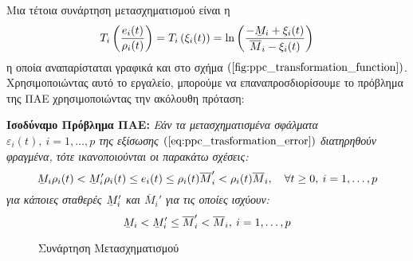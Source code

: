 Μια τέτοια συνάρτηση μετασχηματισμού είναι η
\begin{equation}
	T_i \left( \frac{e_i(t)}{\rho_i(t)} \right) = T_i \left( \xi_i(t) \right) =
	\ln \left( \frac{-\barbelow{M}_i + \xi_i(t) }{\overline{M}_i - \xi_i(t)} \right)
	\label{eq:ppc_log_transform}
\end{equation}
η οποία αναπαρίσταται γραφικά και στο σχήμα $(\ref{fig:ppc_transformation_function})$. Χρησιμοποιώντας αυτό το εργαλείο, μπορούμε να επαναπροσδιορίσουμε το πρόβλημα της ΠΑΕ χρησιμοποιώντας την ακόλουθη πρόταση:

\textbf{Ισοδύναμο Πρόβλημα ΠΑΕ:}
\textit{ Εάν τα μετασχηματισμένα σφάλματα $\varepsilon_i(t), \: i = 1,\dots ,p$ της εξίσωσης $(\ref{eq:ppc_trasformation_error})$ διατηρηθούν φραγμένα, τότε ικανοποιούνται οι παρακάτω σχέσεις:
\begin{equation*}
\barbelow{M}_i \rho_i(t) < \barbelow{M}_i' \rho_i(t) \leq e_i(t) \leq \rho_i(t) \overline{M}_i' < \rho_i(t) \overline{M}_i, \quad \forall t \geq 0, \: i = 1,\dots ,p
\end{equation*}
για κάποιες σταθερές $\barbelow{M}_i'$ και $\overline{M}_i'$ για τις οποίες ισχύουν:
\begin{equation}
\barbelow{M}_i < \barbelow{M}_i' \leq \overline{M}_i' < \overline{M}_i, \: i = 1,\dots ,p
\label{eq:overshoot_bounds}
\end{equation}
}

\begin{figure}
	\centering
	
	\caption{Συνάρτηση Μετασχηματισμού}
	\label{fig:ppc_transformation_function}
\end{figure}


